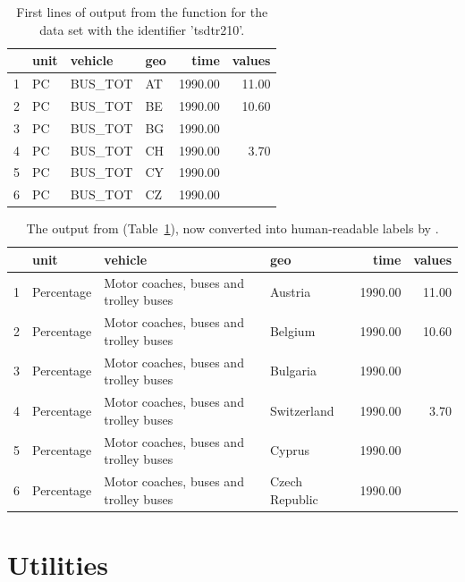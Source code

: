 \begin{table}[ht!]
\centering
\begin{tabular}{rlllrr}
\toprule
  \hline
 & unit & vehicle & geo & time & values \\ 
  \hline
  1 & PC & BUS\_TOT & AT & 1990.00 & 11.00 \\ 
  2 & PC & BUS\_TOT & BE & 1990.00 & 10.60 \\ 
  3 & PC & BUS\_TOT & BG & 1990.00 &  \\ 
  4 & PC & BUS\_TOT & CH & 1990.00 & 3.70 \\ 
  5 & PC & BUS\_TOT & CY & 1990.00 &  \\ 
  6 & PC & BUS\_TOT & CZ & 1990.00 &  \\ 
   \hline
\bottomrule   
\end{tabular}
\caption{First lines of output from the  function for the data set with the identifier 'tsdtr210'.}
\label{tab:getdatatable}
\end{table}

\begin{table}[h!]
\centering
\begin{tabular}{rlllrr}
\toprule
  \hline
  & unit & vehicle & geo & time & values \\ 
  \hline
  1 & Percentage & Motor coaches, buses and trolley buses & Austria & 1990.00 & 11.00 \\ 
  2 & Percentage & Motor coaches, buses and trolley buses & Belgium & 1990.00 & 10.60 \\ 
  3 & Percentage & Motor coaches, buses and trolley buses & Bulgaria & 1990.00 &  \\ 
  4 & Percentage & Motor coaches, buses and trolley buses & Switzerland & 1990.00 & 3.70 \\ 
  5 & Percentage & Motor coaches, buses and trolley buses & Cyprus & 1990.00 &  \\ 
  6 & Percentage & Motor coaches, buses and trolley buses & Czech Republic & 1990.00 &  \\ 
   \hline 
\bottomrule     
\end{tabular}
\caption{The output from  (Table~\ref{tab:getdatatable}), now converted into human-readable labels by .}
\label{tab:getdatatable2}
\end{table}


\section{Utilities}

